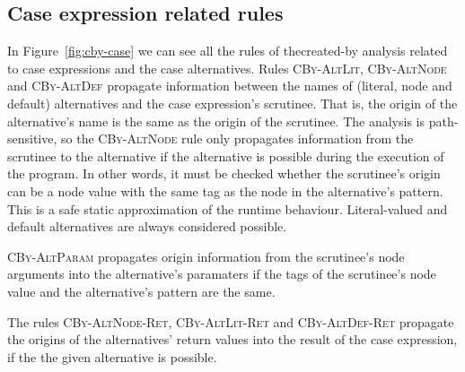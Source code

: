 \documentclass[main.tex]{subfiles}
\begin{document}
	\subsection{Case expression related rules}
	
	In Figure~\ref{fig:cby-case} we can see all the rules of thecreated-by analysis related to case expressions and the case alternatives. Rules \textsc{CBy-AltLit}, \textsc{CBy-AltNode} and \textsc{CBy-AltDef} propagate information between the names of (literal, node and default) alternatives and the case expression's scrutinee. That is, the origin of the alternative's name is the same as the origin of the scrutinee. The analysis is path-sensitive, so the \textsc{CBy-AltNode} rule only propagates information from the scrutinee to the alternative if the alternative is possible during the execution of the program. In other words, it must be checked whether the scrutinee's origin can be a node value with the same tag as the node in the alternative's pattern. This is a safe static approximation of the runtime behaviour. Literal-valued and default alternatives are always considered possible.
	
	\textsc{CBy-AltParam} propagates origin information from the scrutinee's node arguments into the alternative's paramaters if the tags of the scrutinee's node value and the alternative's pattern are the same.
	
	The rules \textsc{CBy-AltNode-Ret}, \textsc{CBy-AltLit-Ret} and \textsc{CBy-AltDef-Ret} propagate the origins of the alternatives' return values into the result of the case expression, if the the given alternative is possible.
\end{document}
